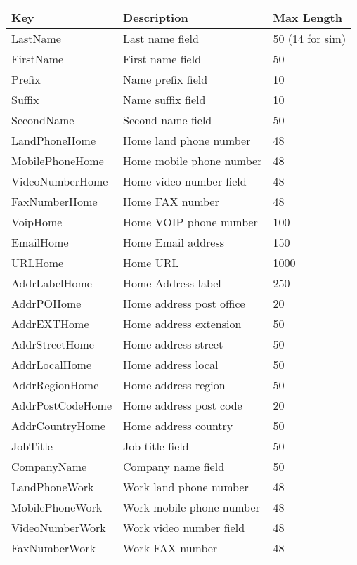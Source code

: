 \begin{table}[htbp]
\begin{center}
\begin{tabular}{l|l|l}
\hline
{\bf Key} & {\bf Description} & {\bf Max Length}  \\
\hline
{\color{red}LastName} & Last name field & 50 (14 for sim)  \\
\hline
FirstName & First name field & 50  \\
\hline
Prefix & Name prefix field & 10  \\
\hline
Suffix & Name suffix field & 10  \\
\hline
SecondName & Second name field & 50  \\
\hline
LandPhoneHome & Home land phone number & 48  \\
\hline
MobilePhoneHome & Home mobile phone number & 48  \\
\hline
VideoNumberHome & Home video number field & 48  \\
\hline
FaxNumberHome & Home FAX number & 48  \\
\hline
VoipHome & Home VOIP phone number & 100  \\
\hline
EmailHome & Home Email address & 150  \\
\hline
URLHome & Home URL & 1000  \\
\hline
AddrLabelHome & Home Address label & 250  \\
\hline
AddrPOHome & Home address post office & 20  \\
\hline
AddrEXTHome & Home address extension & 50  \\
\hline
AddrStreetHome & Home address street & 50  \\
\hline
AddrLocalHome & Home address local & 50  \\
\hline
AddrRegionHome & Home address region & 50  \\
\hline
AddrPostCodeHome & Home address post code & 20  \\
\hline
AddrCountryHome & Home address country & 50  \\
\hline
JobTitle & Job title field & 50  \\
\hline
CompanyName & Company name field & 50  \\
\hline
LandPhoneWork & Work land phone number & 48  \\
\hline
MobilePhoneWork & Work mobile phone number & 48  \\
\hline
VideoNumberWork & Work video number field & 48  \\
\hline
FaxNumberWork & Work FAX number & 48  \\

\end{tabular}
\end{center}
\end{table}
